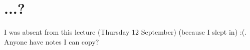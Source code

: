 \section{...?}

I was absent from this lecture (Thursday 12 September)
(because I slept in) :(. Anyone have notes I can copy?
